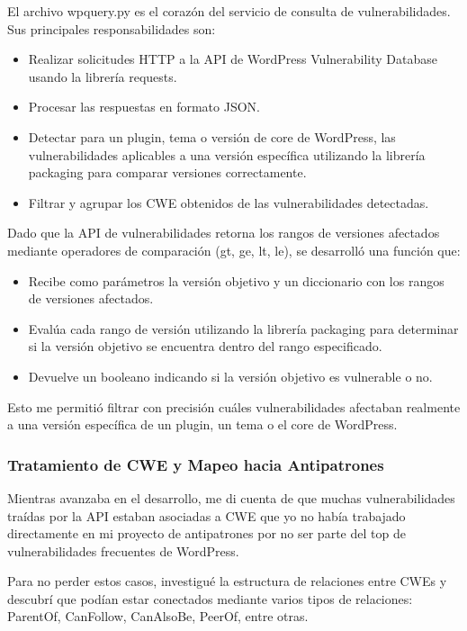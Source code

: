El archivo wpquery.py es el corazón del servicio de consulta de vulnerabilidades.
Sus principales responsabilidades son:
\begin{itemize}
    \item Realizar solicitudes HTTP a la API de WordPress Vulnerability Database usando la librería requests.
    \item Procesar las respuestas en formato JSON.
    \item Detectar para un plugin, tema o versión de core de WordPress, las vulnerabilidades aplicables a una versión específica utilizando la librería packaging para comparar versiones correctamente.
    \item Filtrar y agrupar los CWE obtenidos de las vulnerabilidades detectadas.
\end{itemize}

Dado que la API de vulnerabilidades retorna los rangos de versiones afectados mediante operadores de comparación (gt, ge, lt, le), se desarrolló una función que:
\begin{itemize}
    \item Recibe como parámetros la versión objetivo y un diccionario con los rangos de versiones afectados.
    \item Evalúa cada rango de versión utilizando la librería packaging para determinar si la versión objetivo se encuentra dentro del rango especificado.
    \item Devuelve un booleano indicando si la versión objetivo es vulnerable o no.
\end{itemize}

Esto me permitió filtrar con precisión cuáles vulnerabilidades afectaban realmente a una versión específica de un plugin, un tema o el core de WordPress.

\subsubsection{Tratamiento de CWE y Mapeo hacia Antipatrones}

Mientras avanzaba en el desarrollo, me di cuenta de que muchas vulnerabilidades traídas por la API estaban asociadas a CWE que yo no había trabajado directamente en mi proyecto de antipatrones por no ser parte del top de vulnerabilidades frecuentes de WordPress.

Para no perder estos casos, investigué la estructura de relaciones entre CWEs y descubrí que podían estar conectados mediante varios tipos de relaciones: ParentOf, CanFollow, CanAlsoBe, PeerOf, entre otras.

